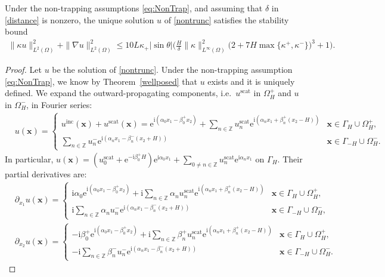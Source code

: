 \documentclass[a4paper,10pt]{article}
\newcommand{\IZ}{{\mathbb Z}}
\newcommand{\bx}{{\mathbf x}}
\newcommand{\ri}{{\mathrm i}}
\newcommand{\re}{{\mathrm e}}
\newcommand{\inc}{{\mathrm{inc}}}
\newcommand{\scat}{{\mathrm{scat}}}
\newcommand{\dxo}{{\partial_{x_1}}}
\newcommand{\dxt}{{\partial_{x_2}}}
\newcommand{\GH}{{\Gamma_H}}
\newcommand{\GmH}{{\Gamma_{-H}}}
\begin{document}
\begin{thm} \label{thm-stima}
Under the non-trapping assumptions \eqref{eq:NonTrap}, and assuming that $\delta$ in \eqref{distance} is nonzero,  the unique solution $u$ of \eqref{nontrunc} satisfies the stability bound
\begin{align}\label{stimaH1} 
	\|\kappa u\|_{L^2(\Omega)}^2 + \|\nabla u\|_{L^2(\Omega)}^2
	\le 10L\kappa_+|\sin\theta|\bigg(\frac H\delta\|\kappa\|_{L^\infty(\Omega)}^2
	\big(2+7H\max\{\kappa^+,\kappa^-\}\big)^3+1\bigg).
\end{align}
\end{thm}
\begin{proof}
Let $u$ be the solution of \eqref{nontrunc}.
Under the non-trapping assumption \eqref{eq:NonTrap}, we know by Theorem~\ref{wellposed} that $u$ exists and it is uniquely defined.
We expand the outward-propagating components, 
i.e.\ $u^\scat$ in $\Omega_H^+$ and $u$ in $\Omega_H^-$, in Fourier series:
\begin{align*}
	&u(\bx)=
	\begin{cases}\displaystyle
		u^\inc(\bx)+u^\scat(\bx)
		=\re^{\ri(\alpha_0x_1-\beta_0^+x_2)}+
		\sum_{n \in \IZ}u_n^\scat\re^{\ri(\alpha_nx_1+\beta_n^+ (x_2-H))} & \bx\in\GH\cup \Omega_H^+,
		\\\displaystyle
		\sum_{n \in \IZ}u_n^-\re^{\ri(\alpha_nx_1-\beta_n^- (x_2+H))} & \bx\in\GmH\cup \Omega_H^-.
	\end{cases}
\end{align*}
In particular,
$u(\bx)=(u_0^\scat+\re^{-\ri\beta_0^+H})\re^{\ri\alpha_0x_1}
+\sum_{0\ne n \in \IZ}u_n^\scat\re^{\ri\alpha_nx_1}$ on $\GH$.
Their partial derivatives are:
\begin{align*}
	&\dxo u(\bx)=
	\begin{cases}\displaystyle
		\ri\alpha_0\re^{\ri(\alpha_0x_1-\beta_0^+x_2)}+
		\ri\sum_{n \in \IZ}\alpha_n u_n^\scat\re^{\ri(\alpha_nx_1+\beta_n^+ (x_2-H))} & \bx\in\GH\cup \Omega_H^+,
		\\\displaystyle
		\ri\sum_{n \in \IZ}\alpha_n u_n^-\re^{\ri(\alpha_nx_1-\beta_n^- (x_2+H))} & \bx\in\GmH\cup \Omega_H^-,
	\end{cases}
	\\
	&\dxt u(\bx)=
	\begin{cases}\displaystyle
		-\ri\beta_0^+\re^{\ri(\alpha_0x_1-\beta_0^+x_2)}+
		\ri\sum_{n \in \IZ}\beta_n^+ u_n^\scat\re^{\ri(\alpha_nx_1+\beta_n^+ (x_2-H))} & \bx\in\GH\cup \Omega_H^+,
		\\\displaystyle
		-\ri\sum_{n \in \IZ}\beta_n^- u_n^-\re^{\ri(\alpha_nx_1-\beta_n^- (x_2+H))} & \bx\in\GmH\cup \Omega_H^-.

\end{cases}
\end{align*}
\end{proof}
\end{document}
